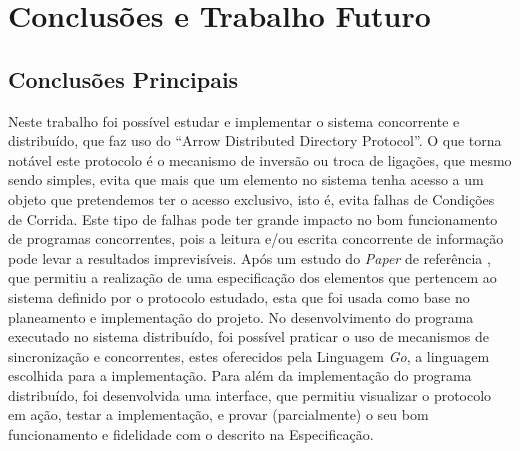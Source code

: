 \chapter{Conclusões e Trabalho Futuro}
\label{chap:conc-trab-futuro}

\section{Conclusões Principais}
\label{sec:conc-princ}

\begin{comment}
    Lições aprendidas
    - Implementaçã de um sistema concorrente e distribuído
    - Evitar race conditions
    - Oportunidade de usar Mecanismos de Sincronização e Concorrência

    Pontos Principais
    - o que é que foi possível fazer
    - o que é em geral este trabalho/implementação
    - possível implementação moderna com visualização do algoritmo 

\end{comment}


Neste trabalho foi possível estudar e implementar o sistema concorrente e distribuído, que faz uso do ``Arrow Distributed Directory Protocol''.
O que torna notável este protocolo é o mecanismo de inversão ou troca de ligações, que mesmo sendo simples,
evita que mais que um elemento no sistema tenha acesso a um objeto que pretendemos ter o acesso exclusivo, isto é, evita falhas de Condições de Corrida.
Este tipo de falhas pode ter grande impacto no bom funcionamento de programas concorrentes, pois a leitura e/ou escrita concorrente de 
informação pode levar a resultados imprevisíveis. 
Após um estudo do \emph{Paper} de referência \cite{Arrow}, que permitiu a realização de uma especificação dos elementos que pertencem ao sistema definido por o protocolo estudado,
esta que foi usada como base no planeamento e implementação do projeto.
No desenvolvimento do programa executado no sistema distribuído, foi possível praticar o uso de mecanismos de sincronização e concorrentes, estes oferecidos pela Linguagem \emph{Go},
a linguagem escolhida para a implementação.
Para além da implementação do programa distribuído, foi desenvolvida uma interface, que permitiu visualizar o protocolo em ação, testar a implementação, e provar (parcialmente) o seu
bom funcionamento e fidelidade com o descrito na Especificação.


